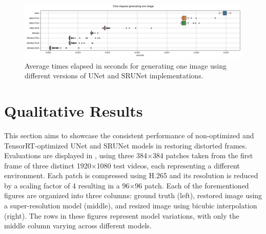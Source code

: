 \begin{figure}[ht]
\includegraphics[width=1.0\textwidth]{static/boxplots_timings.jpg}
\caption{Average times elapsed in seconds for generating one image using different versions of UNet and SRUNet implementations.}
\label{fig:timings}
\end{figure}


\clearpage

\section{Qualitative Results}
\label{sec:qualitative-results}

This section aims to showcase the consistent performance of non-optimized and TensorRT-optimized UNet and SRUNet models in restoring distorted frames. Evaluations are displayed in , using three 384$\times$384 patches taken from the first frame of three distinct 1920$\times$1080 test videos, each representing a different environment. Each patch is compressed using H.265 and its resolution is reduced by a scaling factor of 4 resulting in a 96$\times$96 patch. Each of the forementioned figures are organized into three columns: ground truth (left), restored image using a super-resolution model (middle), and resized image using bicubic interpolation (right). The rows in these figures represent model variations, with only the middle column varying across different models.

